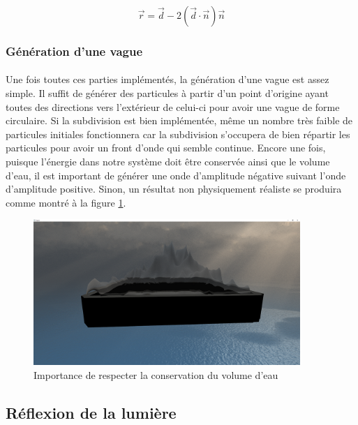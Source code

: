 \documentclass[a4paper, 12pt]{article} %
\begin{document}
	    \begin{equation}
	    	\vec{r} = \vec{d} - 2 (\vec{d} \cdot \vec{n}) \vec{n}
	    \end{equation}

	\subsubsection{Génération d'une vague}
	    \paragraph{}
	    Une fois toutes ces parties implémentés, la génération d'une vague est assez simple. Il suffit de générer des particules à partir
	    d'un point d'origine ayant toutes des directions vers l'extérieur de celui-ci pour avoir une vague de forme circulaire. Si la 
	    subdivision est bien implémentée, même un nombre très faible de particules initiales fonctionnera car la subdivision s'occupera
	    de bien répartir les particules pour avoir un front d'onde qui semble continue. Encore une fois, puisque l'énergie dans notre système
	    doit être conservée ainsi que le volume d'eau, il est important de générer une onde d'amplitude négative suivant l'onde d'amplitude
	    positive. Sinon, un résultat non physiquement réaliste se produira comme montré à la figure \ref{WaterConservation}.

       	    \begin{figure}
       	    	\centering
       	    	\includegraphics[width=0.9\textwidth]{./PhotoRapport/WaterConservation.png}
       	    	\caption{Importance de respecter la conservation du volume d'eau}
       	    	\label{WaterConservation}
       	    \end{figure}

    \subsection{Réflexion de la lumière}
\end{document}
